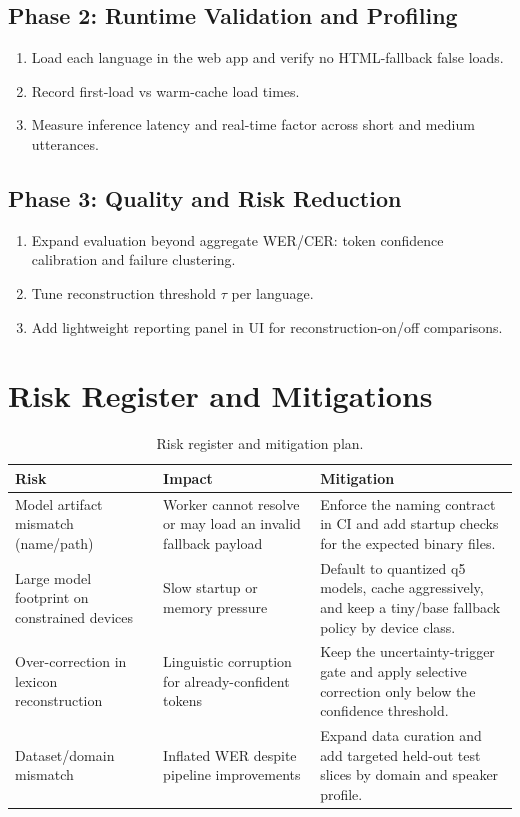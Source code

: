 \documentclass[11pt]{article}
\begin{document}
\subsection{Phase 2: Runtime Validation and Profiling}
\begin{enumerate}
    \item Load each language in the web app and verify no HTML-fallback false loads.
    \item Record first-load vs warm-cache load times.
    \item Measure inference latency and real-time factor across short and medium utterances.
\end{enumerate}

\subsection{Phase 3: Quality and Risk Reduction}
\begin{enumerate}
    \item Expand evaluation beyond aggregate WER/CER: token confidence calibration and failure clustering.
    \item Tune reconstruction threshold $\tau$ per language.
    \item Add lightweight reporting panel in UI for reconstruction-on/off comparisons.
\end{enumerate}

\section{Risk Register and Mitigations}
\begin{table}[t]
\centering
\small
\caption{Risk register and mitigation plan.}
\begin{tabular}{@{}p{}p{}p{}@{}}
\toprule
\textbf{Risk} & \textbf{Impact} & \textbf{Mitigation} \\
\midrule
Model artifact mismatch (name/path) & Worker cannot resolve or may load an invalid fallback payload & Enforce the naming contract in CI and add startup checks for the expected binary files. \\
Large model footprint on constrained devices & Slow startup or memory pressure & Default to quantized q5 models, cache aggressively, and keep a tiny/base fallback policy by device class. \\
Over-correction in lexicon reconstruction & Linguistic corruption for already-confident tokens & Keep the uncertainty-trigger gate and apply selective correction only below the confidence threshold. \\
Dataset/domain mismatch & Inflated WER despite pipeline improvements & Expand data curation and add targeted held-out test slices by domain and speaker profile. \\
\bottomrule
\end{tabular}
\end{table}
\end{document}

